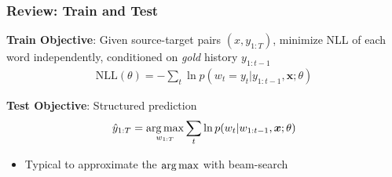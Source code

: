\documentclass{beamer}
\newcommand{\air}{\vspace{0.25cm}}
\newcommand{\boldx}{\boldsymbol{x}}
\def\argmax{\operatornamewithlimits{arg\,max}}
\def\argmax{\operatornamewithlimits{arg\,max}}
\def\argmax{\operatornamewithlimits{arg\,max}}
\begin{document}
\begin{frame}
  \frametitle{Review: Train and Test}

  \textbf{Train Objective}: Given source-target pairs $(x, y_{1:T})$, minimize NLL of each word independently, conditioned on \textit{gold} history $y_{1:t-1}$
\begin{align*}
\text{NLL}(\theta) = -\sum_{t} \ln p(w_{t} = y_t | y_{1:t-1}, \boldx; \theta) 
\end{align*}

  \air

\textbf{Test Objective}:  Structured prediction
  \begin{align*}
  \hat{y}_{1:T} = \argmax_{w_{1:T}} \sum_{t} \ln p(w_{t} | w_{1:t-1}, \boldx; \theta)
\end{align*}
\begin{itemize}
\item Typical to approximate the $\argmax$ with beam-search
\end{itemize}
\end{frame}
\end{document}
